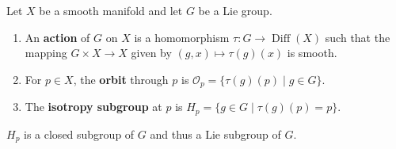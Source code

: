 Let $X$ be a smooth manifold and let $G$ be a Lie group.
\begin{enumerate}
\item[(a)] An \textbf{action} of $G$ on $X$ is a homomorphism $\tau: G \to \operatorname{Diff}(X)$ such that the mapping $G \times X \to X$ given by $(g, x) \mapsto \tau(g)(x)$ is smooth.
\item[(b)] For $p \in X$, the \textbf{orbit} through $p$ is $\mathcal{O}_p = \{\tau(g)(p) \mid g \in G\}$.
\item[(c)] The \textbf{isotropy subgroup} at $p$ is $H_p = \{g \in G \mid \tau(g)(p) = p\}$.
\end{enumerate}
$H_p$ is a closed subgroup of $G$ and thus a Lie subgroup of $G$.
